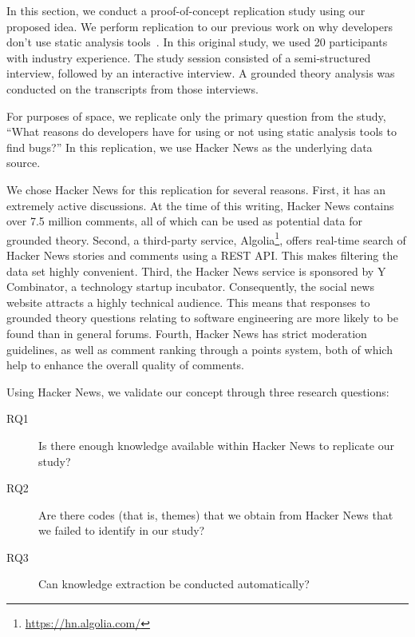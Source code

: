 \documentclass{sig-alternate}
\begin{document}
In this section, we conduct a proof-of-concept replication study using our proposed idea. We perform replication to our previous work on why developers don't use static analysis tools~\cite{Johnson2013a}. In this original study, we used 20 participants with industry experience. The study session consisted of a semi-structured interview, followed by an interactive interview. A grounded theory analysis was conducted on the transcripts from those interviews.

For purposes of space, we replicate only the primary question from the study, ``What reasons do developers have for using or not using static analysis tools to find bugs?'' In this replication, we use Hacker News as the underlying data source.

We chose Hacker News for this replication for several reasons. First, it has an extremely active discussions. At the time of this writing, Hacker News contains over 7.5 million comments, all of which can be used as potential data for grounded theory. Second, a third-party service, Algolia\footnote{\url{https://hn.algolia.com/}}, offers real-time search of Hacker News stories and comments using a REST API. This makes filtering the data set highly convenient. Third, the Hacker News service is sponsored by Y Combinator, a technology startup incubator. Consequently, the social news website attracts a highly technical audience. This means that responses to grounded theory questions relating to software engineering are more likely to be found than in general forums. Fourth, Hacker News has strict moderation guidelines, as well as comment ranking through a points system, both of which help to enhance the overall quality of comments. 

Using Hacker News, we validate our concept through three research questions:

\begin{description}
\item[RQ1] Is there enough knowledge available within Hacker News to replicate our study?
\item[RQ2] Are there codes (that is, themes) that we obtain from Hacker News that we failed to identify in our study?
\item[RQ3] Can knowledge extraction be conducted automatically?
\end{description}

\end{document}
